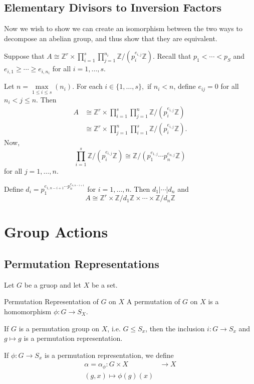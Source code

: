 \documentclass{article}
\begin{document}
\subsection{Elementary Divisors to Inversion Factors}
Now we wish to show we can create an isomorphism between the two ways to decompose an abelian group, and thus show that they are equivalent.

Suppose that $A \cong \mathbb{Z}^r \times \prod_{i=1}^s \prod_{j=1}^{n_i} \mathbb{Z}/(p_i^{e_{i,j}}\mathbb{Z})$. Recall that $p_1<\cdots < p_S$ and $e_{i,1}\ge \cdots \ge e_{i,n_i}$ for all $i=1,\dots, s$.

Let $n=\underset{1\le i \le s}{\max}(n_i)$. For each $i\in \{1,\dots, s\},$ if $n_i < n$, define $e_{ij}=0$ for all $n_i < j \le n$. Then
\begin{align*}
    A & \cong \mathbb{Z}^r \times \prod_{i=1}^s \prod_{j=1}^n \mathbb{Z}/(p_i^{e_{i,j}}\mathbb{Z})  \\
      & \cong \mathbb{Z}^r \times \prod_{j=1}^n \prod_{i=1}^s \mathbb{Z}/(p_i^{e_{i,j}}\mathbb{Z}).
\end{align*}
Now,
\begin{equation*}
    \prod_{i=1}^s \mathbb{Z}/(p_i^{e_{i,j}}\mathbb{Z}) \cong \mathbb{Z}/(p_1^{e_{1,j}}\cdots p_n^{e_{n,j}}\mathbb{Z})
\end{equation*}
for all $j=1,\dots, n$.

Define $d_i = p_1^{e_{1,n-i+1}\cdots p_n^{e_{n,n-i+1}}}$ for $i=1,\dots, n$. Then $d_1|\cdots | d_n$ and
\begin{equation*}
    A \cong \mathbb{Z}^r \times \mathbb{Z}/d_1\mathbb{Z} \times \cdots \times \mathbb{Z}/d_n\mathbb{Z}
\end{equation*}

\section{Group Actions}
\subsection{Permutation Representations}
Let $G$ be a gruop and let $X$ be a set.
\begin{definition}{Permutation Representation of $G$ on $X$}
    A permutation of $G$ on $X$ is a homomorphism $\phi:G\rightarrow S_X$.
\end{definition}
\begin{example}
    If $G$ is a permutation group on $X$, i.e. $G \le S_x$, then the inclusion $i:G\rightarrow S_x$ and $g\mapsto g$ is a permutation representation.
\end{example}
If $\phi:G\rightarrow S_x$ is a permutation representation, we define
\begin{align*}
    \alpha = \alpha_\phi: G \times X & \rightarrow X \\
    (g,x) \mapsto \phi(g)(x)
\end{align*}
\end{document}
